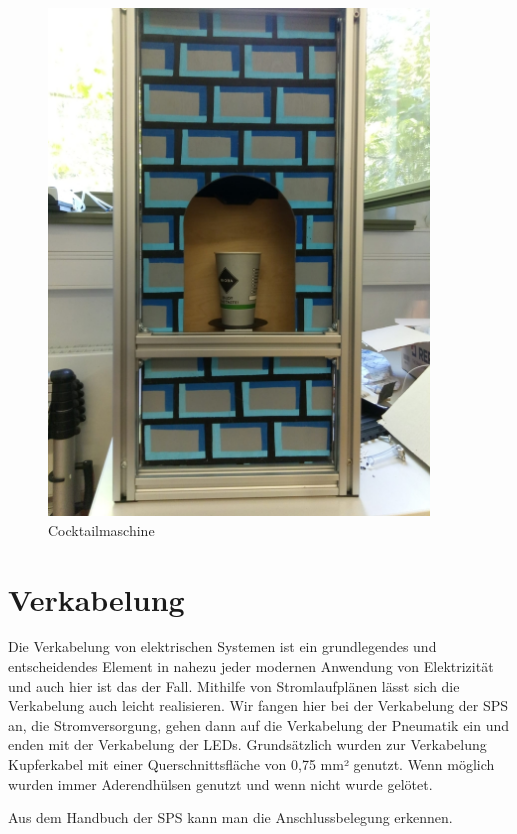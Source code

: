 \documentclass[10pt,a4paper]{report}
\begin{document}
	\begin{figure}[htb]
		\includegraphics[width=0.9\textwidth]{Abb.11_fertige_Cocktailmaschine}
		\centering
		\caption{Cocktailmaschine}
	\end{figure}

	\chapter{Verkabelung}
	Die Verkabelung von elektrischen Systemen ist ein grundlegendes und entscheidendes Element in nahezu jeder modernen Anwendung von Elektrizität und auch hier ist das der Fall. 
	Mithilfe von Stromlaufplänen lässt sich die Verkabelung auch leicht realisieren. 
	Wir fangen hier bei der Verkabelung der SPS an, die Stromversorgung, gehen dann auf die Verkabelung der Pneumatik ein und enden mit der Verkabelung der LEDs. 
	Grundsätzlich wurden zur Verkabelung Kupferkabel mit einer Querschnittsfläche von 0,75 mm² genutzt. Wenn möglich wurden immer Aderendhülsen genutzt und wenn nicht wurde gelötet.
	
	Aus dem Handbuch der SPS kann man die Anschlussbelegung erkennen.
	
\end{document}
